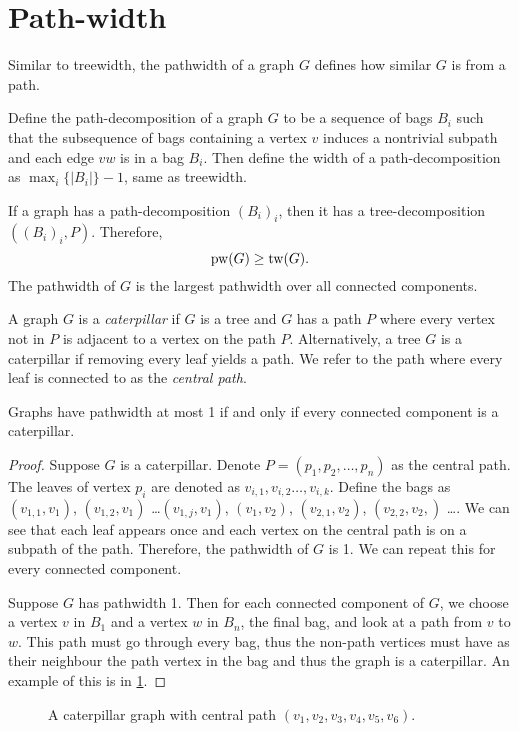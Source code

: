 \section{Path-width}\label{sec:Pathwidth}
Similar to treewidth, the pathwidth of a graph \(G\) defines how similar $G$ is from a path.

Define the path-decomposition of a graph \(G\) to be a sequence of bags \(B_i\) such that the subsequence of bags containing a vertex \(v\) induces a nontrivial subpath and each edge \(vw\) is in a bag \(B_i\). Then define the width of a path-decomposition as \(\max_i \lbrace |B_i| \rbrace -1\), same as treewidth.

If a graph has a path-decomposition \({(B_i)}_i\), then it has a tree-decomposition \(\left({(B_i)}_i, P\right)\). Therefore,
\begin{equation*}
	\operatorname{pw}(G) \geq \operatorname{tw}(G).
\end{equation*}
The pathwidth of \(G\) is the largest pathwidth over all connected components.

A graph \(G\) is a \textit{caterpillar} if \(G\) is a tree and $G$ has a path \(P\) where every vertex not in $P$ is adjacent to a vertex on the path \(P\). Alternatively, a tree \(G\) is a caterpillar if removing every leaf yields a path. We refer to the path where every leaf is connected to as the \textit{central path}.
\begin{proposition}
	Graphs have pathwidth at most 1 if and only if every connected component is a caterpillar.
\end{proposition}
\begin{proof}
	Suppose \(G\) is a caterpillar.
	Denote \(P =\left( p_1, p_2, \dots, p_n\right)\) as the central path. The leaves of vertex \(p_i\) are denoted as \(v_{i, 1}, v_{i, 2} \dots, v_{i, k}\). Define the bags as \((v_{1, 1}, v_1)\), \((v_{1, 2}, v_1)\) \dots \((v_{1, j}, v_1)\),  \((v_1, v_2)\), \((v_{2, 1}, v_2)\), \((v_{2,2}, v_2,)\) \dots. We can see that each leaf appears once and each vertex on the central path is on a subpath of the path. Therefore, the pathwidth of \(G\) is 1. We can repeat this for every connected component.
	\par
	Suppose \(G\) has pathwidth 1. Then for each connected component of \(G\), we choose a vertex \(v\) in \(B_1\) and a vertex \(w\) in \(B_n\), the final bag, and look at a path from \(v\) to \(w\). This path must go through every bag, thus the non-path vertices must have as their neighbour the path vertex in the bag and thus the graph is a caterpillar. An example of this is in \cref{fig:caterpillar}.
\end{proof}
\begin{figure}[ht]
	\centering
	
	\caption[Caterpillar graph]{A caterpillar graph with central path \((v_1, v_2, v_3, v_4, v_5, v_6)\).}\label{fig:caterpillar}
\end{figure}

